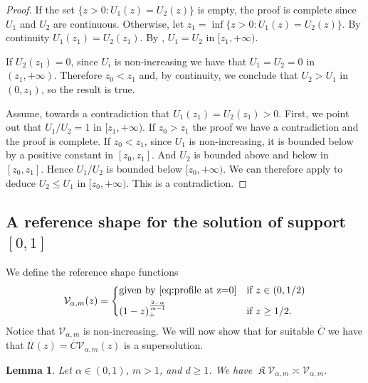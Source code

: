 \documentclass[a4paper]{article}
\newtheorem{lemma}[theorem]{Lemma}
\theoremstyle{definition}
\DeclareMathOperator{\fixedpoint}{\mathfrak K}
\begin{document}
\begin{proof}
If the set $\{ z > 0 : U_1(z) = U_2(z) \}$ is empty, the proof is complete since $U_1$ and $U_2$ are continuous. Otherwise, let $z_1 = \inf\{ z > 0 : U_1(z) = U_2(z) \}$. By continuity $U_1(z_1) = U_2(z_1)$. By , $U_1 = U_2$ in $[z_1,+\infty)$.

If $U_2(z_1) = 0$, since $U_i$ is non-increasing we have that $U_1 = U_2 = 0$ in $(z_1, +\infty)$.
Therefore $z_0 < z_1$ and, by continuity,
we conclude that $U_2 > U_1$ in $(0,z_1)$, so the result is true.

Assume, towards a contradiction that $U_1(z_1) = U_2(z_1) > 0$.
First, we point out that $U_1/U_2 = 1$ in $[z_1,+\infty)$.
If $z_0 > z_1$ the proof we have a contradiction and the proof is complete.
If $z_0 < z_1$, since $U_1$ is non-increasing, it is bounded below by a positive constant in $[z_0,z_1]$.
And $U_2$ is bounded above and below in $[z_0,z_1]$.
Hence $U_1/U_2$ is bounded below $[z_0, +\infty)$.
We can therefore apply  to deduce $U_2 \le U_1$ in $[z_0, +\infty)$.
This is a contradiction.
\end{proof}

\subsection{A reference shape for the solution of support $[0,1]$}
We define the reference shape functions
\begin{equation}
\mathcal V_{\alpha,m} (z) =
\begin{dcases}
  \text{given by } \eqref{eq:profile at z=0} & \text{if } z \in (0,1/2) \\
  (1-z)_+^{\frac{2-\alpha}{m-1}}             & \text{if } z \ge 1/2.
\end{dcases}
\end{equation}
Notice that $\mathcal V_{\alpha,m}$ is non-increasing. We will now show that for suitable $\overline C$ we have that $\overline{\mathcal U}(z) = \overline C \mathcal V_{\alpha,m}(z)$ is a supersolution.

\begin{lemma}
Let $\alpha \in (0,1)$, $m > 1$, and $d \ge 1$. We have $\fixedpoint \mathcal V_{\alpha,m} \asymp \mathcal V_{\alpha,m}$.
\end{lemma}
\end{document}
